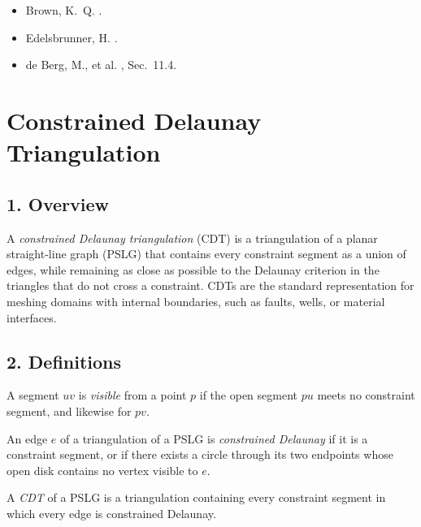 \begin{itemize}
\item Brown, K.~Q. \cite{brown1979}.
\item Edelsbrunner, H. \cite{edelsbrunner1987}.
\item de Berg, M., et al. \cite{deberg2008}, Sec.~11.4.
\end{itemize}

\section{Constrained Delaunay Triangulation}
\label{sec:delaunay_constrained}

\subsection{1. Overview}

A \emph{constrained Delaunay
triangulation} (CDT) is a triangulation of a planar straight-line graph (PSLG)
that contains every constraint segment as a union of edges, while remaining as
close as possible to the Delaunay criterion in the triangles that do not cross
a constraint. CDTs are the standard representation for meshing domains with
internal boundaries, such as faults, wells, or material interfaces.

\subsection{2. Definitions}

\begin{definition}[Visibility]\label{def:cdt_visibility}
A segment $uv$ is \emph{visible} from a point $p$ if the open segment $pu$
meets no constraint segment, and likewise for $pv$.
\end{definition}

\begin{definition}\label{def:cdt_edge}
An edge $e$ of a triangulation of a PSLG is \emph{constrained Delaunay} if it is
a constraint segment, or if there exists a circle through its two endpoints
whose open disk contains no vertex visible to $e$.
\end{definition}

\begin{definition}\label{def:cdt}
A \emph{CDT} of a PSLG is a triangulation containing every constraint segment
in which every edge is constrained Delaunay.
\end{definition}


